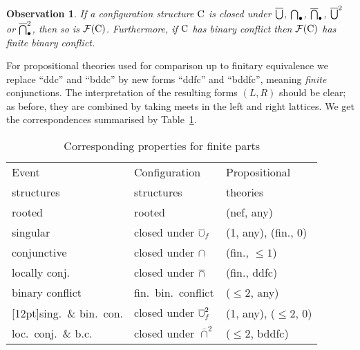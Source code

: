 \documentclass[twocolumn]{article}
\newtheorem{obs}{Observation}[section]
\newenvironment{observation}[1]{\begin{obs} \rm \label{obs-#1} }{\end{obs}}
\newcommand{\bbsmallcap}{\overline{\cap}^2}
\begin{document}
\begin{observation}{finitary closure conditions}
If a configuration structure ${\rm C}$ is closed under $\overline{\bigcup}$,
$\bigcap_{\bullet}$, $\overline{\bigcap}_{\bullet}$, $\overline{\bigcup}^2$ or $\overline{\bigcap}_{\bullet}^2$, then so is ${\cal F}({\rm C})$.
Furthermore, if ${\rm C}$ has binary conflict then ${\cal F}({\rm C})$ has finite
binary conflict.
\end{observation}
For propositional theories used for comparison up to finitary equivalence
we replace ``ddc'' and ``bddc'' by new forms ``ddfc''  and ``bddfc'', meaning
\emph{finite} conjunctions. The interpretation of the resulting forms $(L,R)$ 
should be clear; as before, 
they are combined by taking meets in the left and right lattices.
We get the correspondences summarised by Table~\ref{correspondence_finite}.
\begin{table}[htb]
\begin{tabular}{@{}|@{~}l@{\,}|@{~}l@{~}|@{~}l@{~}|@{}}
\hline
Event           & Configuration                 & Propositional         \\
structures      & structures                    & theories              \\
\hline\hline
rooted          & rooted                        & (nef, any)            \\
singular        & closed under $\overline{\cup}_f$    & (1, any), (fin., 0)   \\
conjunctive     & closed under $\cap$           & (fin., $\leq\!1$)     \\
locally conj.   & closed under $\overline{\cap}$     & (fin., ddfc)          \\
binary conflict & fin.\ bin.\ conflict          & ($\leq\!2$, any)      \\
\hline
\raisebox{0pt}[12pt]{sing}.\ \& bin.\ con.& closed under $\overline{\cup}_f^2$  & (1, any), ($\leq\!2$, 0)\\
loc.\ conj.\ \& b.c.& closed under $\bbsmallcap$& ($\leq\!2$, bddfc)      \\
\hline
\end{tabular}
\caption{Corresponding properties for finite parts \label{correspondence_finite}}
\end{table}
\end{document}
